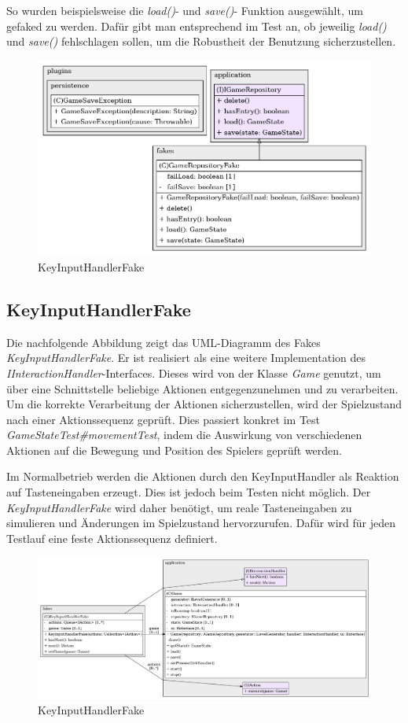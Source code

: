 So wurden beispielsweise die \textit{load()}- und \textit{save()}-
Funktion ausgewählt, um gefaked zu werden. Dafür gibt man entsprechend
im Test an, ob jeweilig \textit{load()} und \textit{save()} 
fehlschlagen sollen, um die Robustheit der Benutzung sicherzustellen.

\vspace{0.5cm}
\begin{figure}[H]
    \centering
    \includegraphics[width=1\linewidth]{Bilder/Visualisierung/GameRepositoryFake_structure.png}
    \caption{KeyInputHandlerFake}
\end{figure}

\subsection{KeyInputHandlerFake}

Die nachfolgende Abbildung zeigt das UML-Diagramm des Fakes
\textit{KeyInputHandlerFake}. Er ist realisiert als eine weitere
Implementation des \textit{IInteractionHandler}-Interfaces. Dieses wird
von der Klasse \textit{Game} genutzt, um über eine Schnittstelle
beliebige Aktionen entgegenzunehmen und zu verarbeiten. Um die
korrekte Verarbeitung der Aktionen sicherzustellen, wird der
Spielzustand nach einer Aktionssequenz geprüft. Dies passiert
konkret im Test \textit{GameStateTest\#movementTest}, indem die
Auswirkung von verschiedenen Aktionen auf die Bewegung und Position
des Spielers geprüft werden.

Im Normalbetrieb werden die Aktionen durch den KeyInputHandler als
Reaktion auf Tasteneingaben erzeugt. Dies ist jedoch beim Testen nicht
möglich. Der \textit{KeyInputHandlerFake} wird daher benötigt, um reale
Tasteneingaben zu simulieren und Änderungen im Spielzustand
hervorzurufen. Dafür wird für jeden Testlauf eine feste
Aktionssequenz definiert.

\vspace{0.5cm}
\begin{figure}[H]
    \centering
    \includegraphics[width=1\linewidth]{Bilder/Visualisierung/KeyInputHandlerFake_structure.png}
    \caption{KeyInputHandlerFake}
\end{figure}
